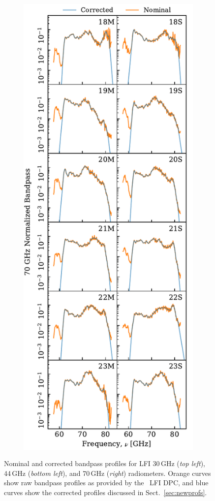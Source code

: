 \documentclass[twocolumn]{aa}
\newcommand{\?}[1]{\textcolor{red}{{\bf [#1]}}}
\begin{document}
\begin{figure}[p]
\begin{subfigure}{0.45\linewidth}
    \includegraphics[width=\linewidth]{figs/bpcorrected_70GHz.pdf}
  \end{subfigure}
  \caption{Nominal and corrected bandpass profiles for LFI 30\,GHz
    (\emph{top left}), 44\,GHz (\emph{bottom left}), and 70\,GHz
    (\emph{right}) radiometers. Orange curves show raw bandpass
    profiles as provided by the \Planck\ LFI DPC, and blue curves show
  the corrected profiles discussed in Sect.~\ref{sec:newprofs}. }
  \label{fig:corrected_bp}
\end{figure}
\end{document}
